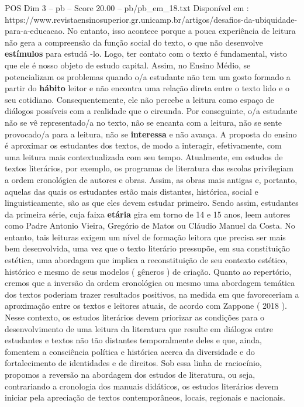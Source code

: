 \begin{textsample}{POS Dim 3 – pb – Score 20.00 – pb/pb\_em\_18.txt}
Disponível em : https://www.revistaensinosuperior.gr.unicamp.br/artigos/desafios-da-ubiquidade-para-a-educacao.
No entanto, isso acontece porque a pouca experiência de leitura não gera a compreensão da função social do texto, o que não desenvolve \textbf{estímulos} para estudá -lo.
Logo, ter contato com o texto é fundamental, visto que ele é nosso objeto de estudo capital.
Assim, no Ensino Médio, se potencializam os problemas quando o/a estudante não tem um gosto formado a partir do \textbf{hábito} leitor e não encontra uma relação direta entre o texto lido e o seu cotidiano.
Consequentemente, ele não percebe a leitura como espaço de diálogos possíveis com a realidade que o circunda.
Por conseguinte, o/a estudante não se vê representado/a no texto, não se encanta com a leitura, não se sente provocado/a para a leitura, não se \textbf{interessa} e não avança.
A proposta do ensino é aproximar os estudantes dos textos, de modo a interagir, efetivamente, com uma leitura mais contextualizada com seu tempo.
Atualmente, em estudos de textos literários, por exemplo, os programas de literatura das escolas privilegiam a ordem cronológica de autores e obras.
Assim, as obras mais antigas e, portanto, aquelas das quais os estudantes estão mais distantes, histórica, social e linguisticamente, são as que eles devem estudar primeiro.
Sendo assim, estudantes da primeira série, cuja faixa \textbf{etária} gira em torno de 14 e 15 anos, leem autores como Padre Antonio Vieira, Gregório de Matos ou Cláudio Manuel da Costa.
No entanto, tais leituras exigem um nível de formação leitora que precisa ser mais bem desenvolvida, uma vez que o texto literário pressupõe, em sua constituição estética, uma abordagem que implica a reconstituição de seu contexto estético, histórico e mesmo de seus modelos ( gêneros ) de criação.
Quanto ao repertório, cremos que a inversão da ordem cronológica ou mesmo uma abordagem temática dos textos poderiam trazer resultados positivos, na medida em que favoreceriam a aproximação entre os textos e leitores atuais, de acordo com Zappone ( 2018 ).
Nesse contexto, os estudos literários devem priorizar as condições para o desenvolvimento de uma leitura da literatura que resulte em diálogos entre estudantes e textos não tão distantes temporalmente deles e que, ainda, fomentem a consciência política e histórica acerca da diversidade e do fortalecimento de identidades e de direitos.
Sob essa linha de raciocínio, propomos a reversão na abordagem dos estudos de literatura, ou seja, contrariando a cronologia dos manuais didáticos, os estudos literários devem iniciar pela apreciação de textos contemporâneos, locais, regionais e nacionais.

\end{textsample}
